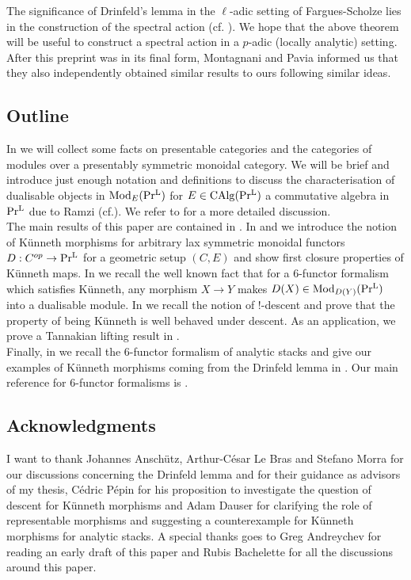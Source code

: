 The significance of Drinfeld's lemma in the $\ell$-adic setting of Fargues-Scholze lies in the construction of the spectral action (cf. \Cite[chapter VI, X]{fargues2021geometrization}). We hope that the above theorem will be useful to construct a spectral action in a $p$-adic (locally analytic) setting. \\

After this preprint was in its final form, Montagnani and Pavia informed us that they also independently obtained similar results to ours following similar ideas.



\subsection*{Outline}
In  we will collect some facts on presentable categories and the categories of modules over a presentably symmetric monoidal category. We will be brief and introduce just enough notation and definitions to discuss the characterisation of dualisable objects in $\operatorname{Mod}_E(\operatorname{Pr^{L}})$ for $E\in \operatorname{CAlg}(\operatorname{Pr^{L}})$ a commutative algebra in $\operatorname{Pr^{L}}$ due to Ramzi (cf.\Cite{ramzi2024dualizable}). We refer to \Cite[Chapter 1]{ramzi2024dualizable} for a more detailed discussion. \\
The main results of this paper are contained in .  In  and  we introduce the notion of Künneth morphisms for arbitrary lax symmetric monoidal functors $D: C^{op} \to \operatorname{Pr^{L}}$ for a geometric setup $(C,E)$ and show first closure properties of Künneth maps.  In  we recall the well known fact that for a $6$-functor formalism which satisfies Künneth, any morphism $X \to Y$ makes $D(X)\in \operatorname{Mod}_{D(Y)}(\operatorname{Pr^{L}})$ into a dualisable module. In  we recall the notion of $!$-descent and prove that the property of being Künneth is well behaved under descent. As an application, we prove a Tannakian lifting result in . \\
Finally, in   we recall the $6$-functor formalism of analytic stacks and give our examples of Künneth morphisms coming from the Drinfeld lemma in . Our main reference for $6$-functor formalisms is \Cite{heyer20246}.

\subsection*{Acknowledgments}
I want to thank Johannes Anschütz, Arthur-César Le Bras and Stefano Morra for our discussions concerning the Drinfeld lemma and for their guidance as advisors of my thesis, Cédric Pépin for his proposition to investigate the question of descent for Künneth morphisms and Adam Dauser for clarifying the role of representable morphisms and suggesting a counterexample for Künneth morphisms for analytic stacks. A special thanks goes to Greg Andreychev for reading an early draft of this paper and Rubis Bachelette for all the discussions around this paper.

